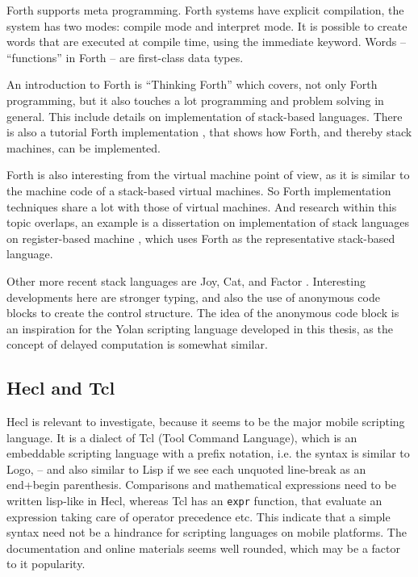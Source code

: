 \documentclass[11pt]{report}
\begin{document}
Forth supports meta programming.
Forth systems have explicit compilation, the system has two modes: compile mode and interpret mode. 
It is possible to create words that are executed at compile time, using the immediate keyword.
Words -- ``functions'' in Forth -- are first-class data types.

An introduction to Forth is
``Thinking Forth'' \cite{thinking-forth} which covers, not only Forth programming, but it also touches a lot programming and problem solving in general. This include details on implementation of stack-based languages.
There is also a tutorial Forth implementation \cite{jones-forth}, that shows how Forth, and thereby stack machines, can be implemented. 

Forth is also interesting from the virtual machine point of view, as it is similar to the machine code of a stack-based virtual machines. So Forth implementation techniques share a lot with those of virtual machines. And research within this topic overlaps, an example is a dissertation on implementation of stack languages on register-based machine \cite{ertl-dissertation}, which uses Forth as the representative stack-based language.

Other more recent stack languages are Joy, Cat, and Factor \cite{factor-language}.
Interesting developments here are stronger typing, and also the use of anonymous code blocks to create the control structure.
The idea of the anonymous code block is an inspiration for the Yolan scripting language developed in this thesis, as the concept of delayed computation is somewhat similar.


\subsection{Hecl and Tcl}
Hecl is relevant to investigate, because it seems to be the major mobile scripting language. 
It is a dialect of Tcl (Tool Command Language), which is an embeddable scripting language \cite{tclbook} with a prefix notation, i.e. the syntax is similar to Logo, -- and also similar to Lisp if we see each unquoted line-break as an end+begin parenthesis.
Comparisons and mathematical expressions need to be written lisp-like in Hecl, whereas Tcl has an \verb|expr| function, that evaluate an expression taking care of operator precedence etc.
This indicate that a simple syntax need not be a hindrance for scripting languages on mobile platforms.
The documentation and online materials seems well rounded, which may be a factor to it popularity.
\end{document}
